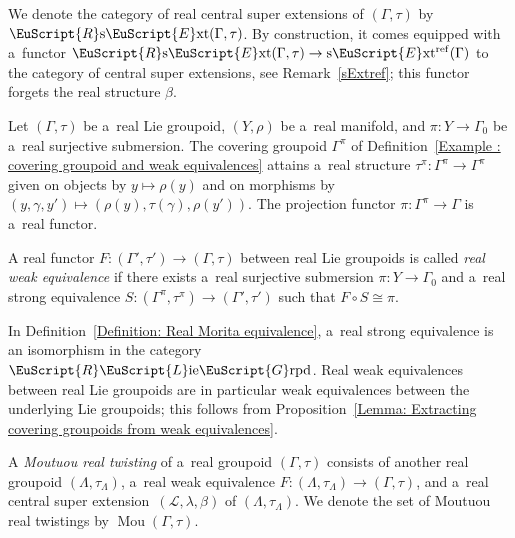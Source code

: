 \documentclass[10pt,a4paper]{amsart}
\numberwithin{equation}{section}
\def\mathscr#1{\EuScript{#1}}
\def\liegrpd{\mathscr{L}\text{ie}\mathscr{G}\text{rpd}}
\def\sExt{\normalfont\text{s}\mathscr{E}\text{xt}}
\def\RsExt{\normalfont\mathscr{R}\text{s}\mathscr{E}\text{xt}}
\def\Mou{\operatorname{Mou}}
\def\Rliegrpd{\normalfont\mathscr{R}\liegrpd}
\begin{document}
We denote the category of real central super extensions of $(\Gamma,\tau)$ by $\RsExt(\Gamma,\tau)$.
By construction, it comes equipped with a~functor
$
\RsExt(\Gamma,\tau) \to \sExt^{\mathrm{ref}}(\Gamma)
$
to the category of central super extensions, see Remark~\ref{sExtref}; this functor forgets the real structure $\beta$.

Let $(\Gamma,\tau)$ be a~real Lie groupoid, $(Y,\rho)$ be a~real manifold, and $\pi \colon Y \to \Gamma_0$ be a~real surjective submersion. The covering groupoid $\Gamma^\pi$
of Definition~\ref{Example : covering groupoid and weak equivalences} attains a~real structure $\tau^\pi \colon \Gamma^\pi \to \Gamma^\pi$ given on objects by
$y \mapsto \rho(y)$ and on morphisms by $(y,\gamma,y') \mapsto (\rho(y),\tau(\gamma),\rho(y'))$. The projection functor $\pi \colon \Gamma^\pi \to \Gamma$ is a~real functor.

\begin{Definition} \label{Definition: Real Morita equivalence}
 A real functor $F\colon (\Gamma',\tau') \to (\Gamma,\tau)$ between real Lie groupoids is called \emph{real weak equivalence} if there exists a~real surjective
 submersion $\pi \colon Y \to \Gamma_0$ and a~real strong equivalence $S \colon (\Gamma^\pi,\tau^\pi) \to (\Gamma',\tau')$ such that $F \circ S \cong \pi$.
\end{Definition}

\begin{Remark}\label{Real weak equivalences have underlying weak equivalences}
In Definition~\ref{Definition: Real Morita equivalence}, a~real strong equivalence is an isomorphism in the category~$\Rliegrpd$.
 Real weak equivalences between real Lie groupoids are in particular weak equivalences between the underlying Lie groupoids; this follows
 from Proposition~\ref{Lemma: Extracting covering groupoids from weak equivalences}.
\end{Remark}

\begin{Definition}
\label{Moutuou-Real-twisting}
 A \emph{Moutuou real twisting} of a~real groupoid $(\Gamma,\tau)$ consists of another real groupoid $(\Lambda,\tau_{\Lambda})$, a~real weak equivalence
 $F\colon (\Lambda,\tau_{\Lambda}) \to (\Gamma,\tau)$, and a~real central super extension~${(\mathcal{L},\lambda,\beta)}$ of $(\Lambda,\tau_{\Lambda})$. We denote
 the set of Moutuou real twistings by $\Mou(\Gamma,\tau)$.
\end{Definition}
\end{document}
